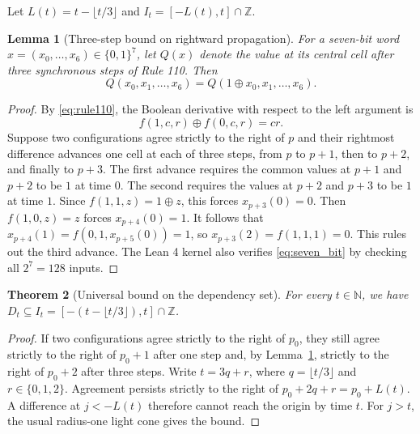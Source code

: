 \documentclass[11pt, a4paper]{article}
\newtheorem{theorem}{Theorem}[section]
\newtheorem{lemma}[theorem]{Lemma}
\begin{document}
Let $L(t) = t - \lfloor t/3 \rfloor$ and $I_t = [-L(t), t] \cap \mathbb{Z}$.

\begin{lemma}[Three-step bound on rightward propagation]\label{lem:three_step}
For a seven-bit word $x = (x_0, \dots, x_6) \in \{0, 1\}^7$, let $Q(x)$ denote the value at its central cell after three synchronous steps of Rule 110. Then
\begin{equation}\label{eq:seven_bit}
Q(x_0, x_1, \dots, x_6) = Q(1 \oplus x_0, x_1, \dots, x_6).
\end{equation}
\end{lemma}

\begin{proof}
By \eqref{eq:rule110}, the Boolean derivative with respect to the left argument is
\begin{equation}\label{eq:bool_deriv}
f(1, c, r) \oplus f(0, c, r) = cr.
\end{equation}
Suppose two configurations agree strictly to the right of $p$ and their rightmost difference advances one cell at each of three steps, from $p$ to $p+1$, then to $p+2$, and finally to $p+3$. The first advance requires the common values at $p+1$ and $p+2$ to be $1$ at time $0$. The second requires the values at $p+2$ and $p+3$ to be $1$ at time $1$. Since $f(1, 1, z) = 1 \oplus z$, this forces $x_{p+3}(0) = 0$. Then $f(1, 0, z) = z$ forces $x_{p+4}(0) = 1$. It follows that $x_{p+4}(1) = f(0, 1, x_{p+5}(0)) = 1$, so $x_{p+3}(2) = f(1, 1, 1) = 0$. This rules out the third advance. The Lean 4 kernel also verifies \eqref{eq:seven_bit} by checking all $2^7 = 128$ inputs.
\end{proof}

\begin{theorem}[Universal bound on the dependency set]\label{thm:upper_bound}
For every $t \in \mathbb{N}$, we have $D_t \subseteq I_t = [-(t - \lfloor t/3 \rfloor), t] \cap \mathbb{Z}$.
\end{theorem}

\begin{proof}
If two configurations agree strictly to the right of $p_0$, they still agree strictly to the right of $p_0 + 1$ after one step and, by Lemma~\ref{lem:three_step}, strictly to the right of $p_0 + 2$ after three steps. Write $t = 3q + r$, where $q = \lfloor t/3 \rfloor$ and $r \in \{0, 1, 2\}$. Agreement persists strictly to the right of $p_0 + 2q + r = p_0 + L(t)$. A difference at $j < -L(t)$ therefore cannot reach the origin by time $t$. For $j > t$, the usual radius-one light cone gives the bound.
\end{proof}
\end{document}
